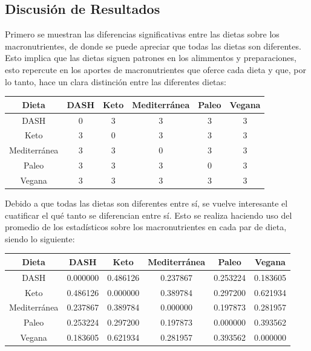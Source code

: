 \documentclass[12pt,a4paper]{article}
\begin{document}
    \subsection{Discusión de Resultados}
    {
        Primero se muestran las diferencias significativas entre las 
        dietas sobre los macronutrientes, de donde se puede apreciar 
        que todas las dietas son diferentes. Esto implica que las dietas 
        siguen patrones en los alimmentos y preparaciones, esto repercute 
        en los aportes de macronutrientes que oferce cada dieta y que, 
        por lo tanto, hace un clara distinción entre las diferentes dietas:

        \begin{center}
            \begin{tabular}{| c | c c c c c |}
                \toprule
                \textbf{Dieta} & DASH & Keto & Mediterránea & Paleo & Vegana \\
                \midrule
                DASH         & 0 & 3 & 3 & 3 & 3 \\
                Keto         & 3 & 0 & 3 & 3 & 3 \\
                Mediterránea & 3 & 3 & 0 & 3 & 3 \\
                Paleo        & 3 & 3 & 3 & 0 & 3 \\
                Vegana       & 3 & 3 & 3 & 3 & 3 \\
                \bottomrule
            \end{tabular}
        \end{center}
        
        Debido a que todas las dietas son diferentes entre sí, se vuelve interesante 
        el cuatificar el qué tanto se diferencian entre sí. Esto se realiza haciendo 
        uso del promedio de los estadísticos sobre los macronutrientes en cada par 
        de dieta, siendo lo siguiente:

        \begin{center}
            \begin{tabular}{| c | c c c c c |}
                \toprule
                \textbf{Dieta} & DASH & Keto & Mediterránea & Paleo & Vegana \\
                \midrule
                DASH         & 0.000000 & 0.486126 & 0.237867 & 0.253224 & 0.183605 \\
                Keto         & 0.486126 & 0.000000 & 0.389784 & 0.297200 & 0.621934 \\
                Mediterránea & 0.237867 & 0.389784 & 0.000000 & 0.197873 & 0.281957 \\
                Paleo        & 0.253224 & 0.297200 & 0.197873 & 0.000000 & 0.393562 \\
                Vegana       & 0.183605 & 0.621934 & 0.281957 & 0.393562 & 0.000000 \\
                \bottomrule
            \end{tabular}            
        \end{center}

}
\end{document}
